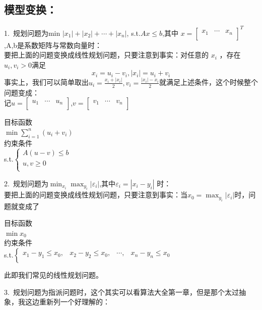 \documentclass[a4paper,20pt]{article}
\begin{document}
\subsection{模型变换：}
1.~规划问题为min $|x_1|+|x_2|+\cdots+|x_n|$,  s.t.$ Ax\leq b$,其中
$x={\begin{bmatrix}
    x_1&\cdots&x_n\\
\end{bmatrix}}^T$
,A,b是系数矩阵与常数向量时：
\\要把上面的问题变换成线性规划问题，只要注意到事实：对任意的 $x_i$ ，存在$
u_i , v_i > 0$满足
$$x_i=u_i-v_i,|x_i|=u_i+v_i$$
事实上，我们可以简单取出$u_i=\frac{x_i+|x_i|}{2},v_i=\frac{|x_i|-x_i}{2}$就满足上述条件，这个时候整个问题变成：
\\记$u=\begin{bmatrix}
    u_1&\cdots&u_n\\
\end{bmatrix}$,$v=\begin{bmatrix}
    v_1&\cdots&v_n\\
\end{bmatrix}$
\begin{center}
        
    目标函数\\ $\min \sum_{i=1}^{n}(u_i+v_i)$
    \\约束条件
    \\s.t.$\left\{\begin{matrix}
       A(u-v)\leq b \\
       u,v \geq 0\\
    \end{matrix}\right.$
\end{center}
    \par 2.~规划问题为$\min_{x_i}{\max_{y_i}|\varepsilon_i|}$,其中$\varepsilon_i=|x_i-y_i|$ 时：
    \\ 要把上面的问题变换成线性规划问题，只要注意到事实：当$x_0=\max_{y_i}|\varepsilon_i|$时，问题就变成了
    \begin{center}
        目标函数\\ $\min x_0$
        \\约束条件
        \\s.t.$\left\{\begin{matrix}
           x_1-y_1\leq x_0 ,&x_2-y_2\leq x_0,&\cdots ,&x_n-y_n\leq x_0\\
        \end{matrix}\right.$
    \end{center}此即我们常见的线性规划问题。
    \par 3.~规划问题为指派问题时，这个其实可以看算法大全第一章，但是那个太过抽象，我这边重新列一个好理解的：
    
\end{document}
